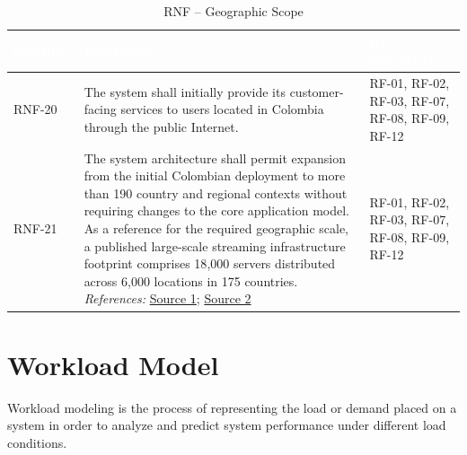 \documentclass{article}
\begin{document}
\begin{table}[H]

\centering

\small

\renewcommand{\arraystretch}{1.35}

\caption{RNF -- Geographic Scope}

\label{tab:rnf_geographic_scope}

\begin{tabularx}{\textwidth}{|p{2.2cm}|X|p{3.5cm}|}

\hline

\rowcolor[HTML]{1F2937}

\textcolor{white}{\textbf{Identifier}} &
\textcolor{white}{\textbf{Description}} &
\textcolor{white}{\textbf{RF associated}} \\ \hline

RNF-20 &
The system shall initially provide its customer-facing services to users located in Colombia through the public Internet.
&
RF-01, RF-02, RF-03, RF-07, RF-08, RF-09, RF-12 \\ \hline

RNF-21 &
The system architecture shall permit expansion from the initial Colombian deployment to more than 190 country and regional contexts without requiring changes to the core application model. As a reference for the required geographic scale, a published large-scale streaming infrastructure footprint comprises 18{,}000 servers distributed across 6{,}000 locations in 175 countries.
\textit{References:} \href{https://help.netflix.com/en/node/14164}{Source 1}; \href{https://about.netflix.com/en/news/open-connect-celebrating-a-decade-of-smooth-and-efficient-streaming}{Source 2}
&
RF-01, RF-02, RF-03, RF-07, RF-08, RF-09, RF-12 \\ \hline

\end{tabularx}

\end{table}


\section{Workload Model}

Workload modeling is the process of representing the load or demand placed on a system in order to analyze and predict system performance under different load conditions. \cite{wmdefinition}
\end{document}
